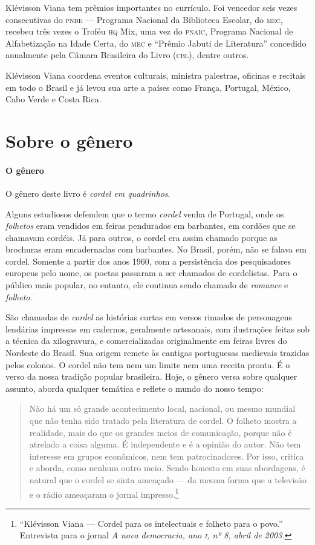 \documentclass[11pt]{extarticle}
\begin{document}
Klévisson Viana tem prêmios importantes no currículo. Foi vencedor seis vezes consecutivas do 
\textsc{pnbe} --- Programa Nacional da Biblioteca Escolar, do \textsc{mec}, recebeu três 
vezes o Troféu \textsc{hq} Mix, uma vez do \textsc{pnaic}, Programa Nacional de Alfabetização 
na Idade Certa, do \textsc{mec} e ``Prêmio Jabuti de Literatura'' concedido anualmente pela 
Câmara Brasileira do Livro (\textsc{cbl}), dentre outros. 

Klévisson Viana coordena eventos culturais, ministra palestras, oficinas e recitais em 
todo o Brasil e já levou sua arte a países como França, Portugal, México, Cabo Verde e Costa Rica. 


\section{Sobre o gênero}

\paragraph{O gênero} O gênero deste livro é \textit{cordel em quadrinhos}. 


Alguns estudiosos defendem que o termo \textit{cordel} venha de Portugal, onde os \textit{folhetos} 
eram vendidos em feiras pendurados em barbantes, em cordões que se chamavam cordéis. Já para
outros, o cordel era assim chamado porque as brochuras eram encadernadas com barbantes. 
No Brasil, porém, não se falava em cordel. Somente a partir dos anos 1960, com a persistência 
dos pesquisadores europeus pelo nome, os poetas passaram a ser chamados de 
cordelistas. Para o público mais popular, no entanto, ele continua sendo chamado de \textit{romance} e 
\textit{folheto}.

São chamadas de \textit{cordel} as histórias curtas em versos rimados de personagens 
lendárias impressas em cadernos, geralmente artesanais, com ilustrações feitas sob a técnica da 
xilogravura, e comercializadas originalmente em feiras livres do Nordeste do Brasil. 
Sua origem remete às cantigas portuguesas medievais trazidas pelos colonos.
O cordel não tem nem um limite nem uma receita pronta. É o verso da 
nossa tradição popular brasileira. Hoje, o gênero versa sobre qualquer 
assunto, aborda qualquer temática e reflete o mundo do nosso tempo:

\begin{quote}
Não há um só grande acontecimento local, nacional, ou mesmo mundial que não tenha sido tratado 
pela literatura de cordel. O folheto mostra a realidade, mais do que os grandes meios de comunicação, 
porque não é atrelado a coisa alguma. É independente e é a opinião do autor. Não tem interesse em 
grupos econômicos, nem tem patrocinadores. Por isso, critica e aborda, como nenhum outro meio. 
Sendo honesto em suas abordagens, é natural que o cordel se sinta ameaçado --- da mesma forma que 
a televisão e o rádio ameaçaram o jornal impresso.\footnote{``Klévisson Viana --- Cordel para os intelectuais e folheto para o povo.'' Entrevista para o jornal \textit{A nova democracia, ano \textsc{i}, nº 8, abril de 2003.}}
\end{quote}
\end{document}

